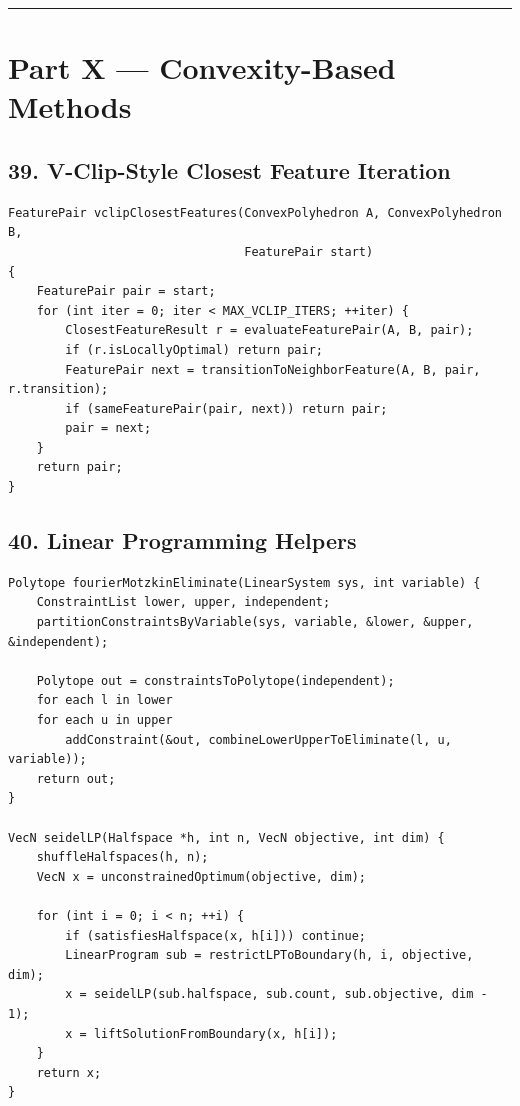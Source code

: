 \documentclass[10pt,letterpaper]{article}
\begin{document}
\medskip\hrule\medskip


\clearpage
{}
\section*{Part X --- Convexity-Based Methods}


\subsection*{39. V-Clip-Style Closest Feature Iteration}

\begin{verbatim}
FeaturePair vclipClosestFeatures(ConvexPolyhedron A, ConvexPolyhedron B,
                                 FeaturePair start)
{
    FeaturePair pair = start;
    for (int iter = 0; iter < MAX_VCLIP_ITERS; ++iter) {
        ClosestFeatureResult r = evaluateFeaturePair(A, B, pair);
        if (r.isLocallyOptimal) return pair;
        FeaturePair next = transitionToNeighborFeature(A, B, pair, r.transition);
        if (sameFeaturePair(pair, next)) return pair;
        pair = next;
    }
    return pair;
}
\end{verbatim}


\subsection*{40. Linear Programming Helpers}

\begin{verbatim}
Polytope fourierMotzkinEliminate(LinearSystem sys, int variable) {
    ConstraintList lower, upper, independent;
    partitionConstraintsByVariable(sys, variable, &lower, &upper, &independent);

    Polytope out = constraintsToPolytope(independent);
    for each l in lower
    for each u in upper
        addConstraint(&out, combineLowerUpperToEliminate(l, u, variable));
    return out;
}

VecN seidelLP(Halfspace *h, int n, VecN objective, int dim) {
    shuffleHalfspaces(h, n);
    VecN x = unconstrainedOptimum(objective, dim);

    for (int i = 0; i < n; ++i) {
        if (satisfiesHalfspace(x, h[i])) continue;
        LinearProgram sub = restrictLPToBoundary(h, i, objective, dim);
        x = seidelLP(sub.halfspace, sub.count, sub.objective, dim - 1);
        x = liftSolutionFromBoundary(x, h[i]);
    }
    return x;
}
\end{verbatim}
\end{document}
